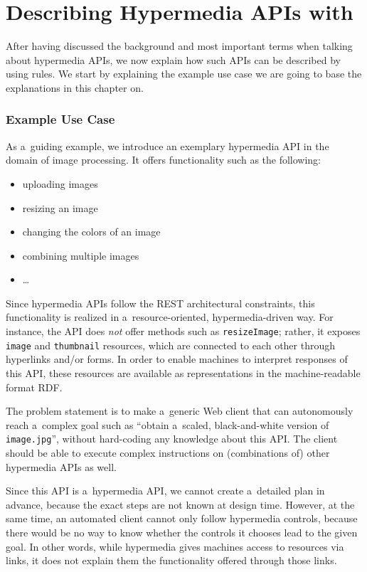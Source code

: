 \section{Describing Hypermedia APIs with \restdesc}
\label{sec:RESTdesc}
After having discussed the background and most important terms when talking about hypermedia APIs, we now explain how such APIs can be described by using \nthree rules. We start by explaining the example 
use case we are going to base the explanations in this chapter on.

\subsubsection{Example Use Case}\label{usecase}
As a~guiding example, we introduce an exemplary hypermedia API
in the domain of image processing.
It offers functionality such as the following:
\begin{itemize}
  \item uploading images
  \item resizing an image
  \item changing the colors of an image
  \item combining multiple images
  \item \ldots
\end{itemize}
Since hypermedia APIs follow the REST architectural constraints,
this functionality is realized in a~resource-oriented, hypermedia-driven way.
For instance, the API does \emph{not} offer methods such as \verb!resizeImage!;
rather, it exposes \verb!image! and \verb!thumbnail! resources,
which are connected to each other through hyperlinks and/or forms.
In order to enable machines to interpret responses of this API,
these resources are available as representations in the machine-readable format RDF.

The problem statement is to make a~generic Web client
that can autonomously reach a~complex goal such as
``obtain a~scaled, black-and-white version of \verb!image.jpg!'',
without hard-coding any knowledge about this API.
The client should be able to execute complex instructions
on (combinations of) other hypermedia APIs as well.

Since this API is a~hypermedia API,
we cannot create a~detailed plan in advance,
because the exact steps are not known at design time.
However, at the same time,
an automated client cannot only follow hypermedia controls,
because there would be no way to know
whether the controls it chooses lead to the given goal.
In other words,
while hypermedia gives machines access to resources via links,
it does not explain them the functionality offered through those links.

